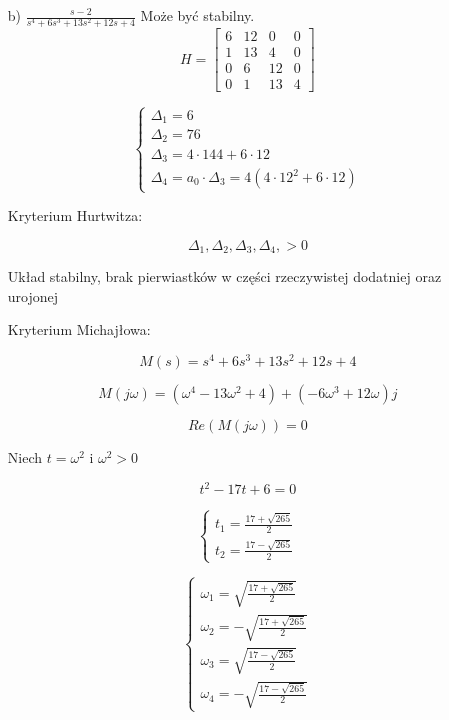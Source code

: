 \documentclass{article}
\begin{document}
\begin{itemize}
    \newpage

    \item[b)] $\frac{s-2}{s^{4}+6s^{3}+13s^{2}+12s+4}$
    Może być stabilny.
    $$ H=
    \begin{bmatrix}
        6 & 12 &  0 & 0\\
        1 & 13 &  4 & 0\\
        0 &  6 & 12 & 0\\
        0 &  1 & 13 & 4
        \end{bmatrix}$$

    \[\begin{cases}
        \Delta_{1}=6\\
        \Delta_{2}=76\\
        \Delta_{3}=4\cdot144+6\cdot12\\
        \Delta_{4}=a_{0}\cdot \Delta_{3}=4(4\cdot12^{2}+6\cdot12)
    \end{cases}\]

    Kryterium Hurtwitza:

    $$ \Delta_{1}, \Delta_{2}, \Delta_{3}, \Delta_{4}, > 0 $$

    Układ stabilny, brak pierwiastków w części rzeczywistej dodatniej oraz urojonej

    Kryterium Michajłowa:
    
    $$M(s)=s^{4}+6s^{3}+13s^{2}+12s+4$$

    $$M(j\omega) = (\omega^{4}-13\omega^{2}+4) + (-6\omega^{3}+12\omega)j$$

    

    $$ Re(M(j\omega))=0 $$

    Niech $t=\omega^{2} $ i $ \omega^{2}>0$

    $$t^{2}-17t+6=0$$

    \[\begin{cases}
        t_{1}=\frac{17+\sqrt{265}}{2}
        \\
        t_{2}=\frac{17-\sqrt{265}}{2}
    \end{cases}\]

    \[\begin{cases}
        \omega_{1}=\sqrt{\frac{17+\sqrt{265}}{2}}
        \\
        \omega_{2}=-\sqrt{\frac{17+\sqrt{265}}{2}}
        \\
        \omega_{3}=\sqrt{\frac{17-\sqrt{265}}{2}}
        \\
        \omega_{4}=-\sqrt{\frac{17-\sqrt{265}}{2}}
    \end{cases}\]


\end{itemize}
\end{document}
